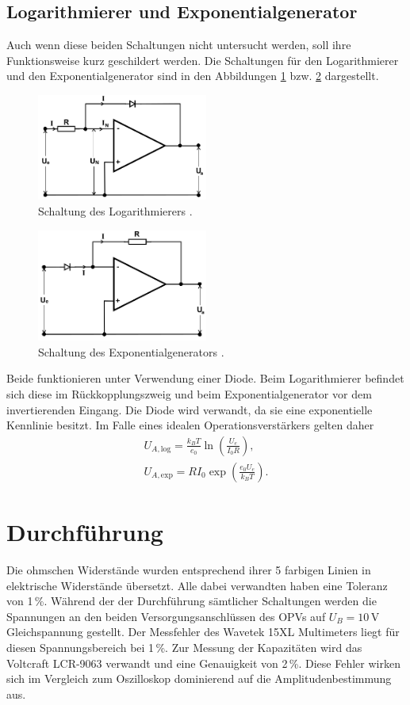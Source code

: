 \subsection{Logarithmierer und Exponentialgenerator}
Auch wenn diese beiden Schaltungen nicht untersucht werden, soll ihre
Funktionsweise kurz geschildert werden. Die Schaltungen für den 
Logarithmierer und den Exponentialgenerator sind in den Abbildungen
\ref{pic:log} bzw. \ref{pic:exp} dargestellt.
\begin{figure}[t]
 \includegraphics[width = 0.5\textwidth]{../pics/log.png}
 \caption{Schaltung des Logarithmierers \cite{Anl}.}
 \label{pic:log}
\end{figure}
\begin{figure}[t]
 \includegraphics[width = 0.5\textwidth]{../pics/exp.png}
 \caption{Schaltung des Exponentialgenerators \cite{Anl}.}
 \label{pic:exp}
\end{figure}
Beide funktionieren unter Verwendung einer Diode. Beim Logarithmierer
befindet sich diese im Rückkopplungszweig und beim Exponentialgenerator
vor dem invertierenden Eingang. Die Diode wird verwandt, da sie eine
exponentielle Kennlinie besitzt. Im Falle eines idealen Operationsverstärkers
gelten daher
\begin{align}
 U_{A,\text{log}} = \frac{k_BT}{e_0} \ln\left(\frac{U_e}{I_0 R}\right),\\
 U_{A,\text{exp}} = RI_0\exp\left(\frac{e_0U_e}{k_BT}\right).
\end{align}



\section{Durchführung}
Die ohmschen Widerstände wurden entsprechend ihrer 5 farbigen Linien in elektrische Widerstände übersetzt. Alle dabei verwandten haben eine
Toleranz von 1\,\%. 
Während der der Durchführung sämtlicher Schaltungen werden die Spannungen an den beiden Versorgungsanschlüssen des OPVs auf $U_B = 10$\,V Gleichspannung gestellt.
Der Messfehler des Wavetek 15XL Multimeters \cite{meterman} liegt für diesen Spannungsbereich bei 1\,\%. Zur Messung der Kapazitäten wird das 
Voltcraft LCR-9063 \cite{conrad} verwandt und eine Genauigkeit von 2\,\%. Diese Fehler wirken sich im Vergleich zum Oszilloskop dominierend auf
die Amplitudenbestimmung aus.

